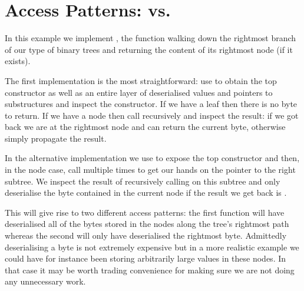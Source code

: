 \section{Access Patterns:  vs. }\label{appendix:rightmost}

In this example we implement , the function walking
down the rightmost branch of our type of binary trees and returning the
content of its rightmost node (if it exists).

The first implementation is the most straightforward: use 
to obtain the top constructor as well as an entire layer of deserialised values
and pointers to substructures and inspect the constructor.
%
If we have a leaf then there is no byte to return.
%
If we have a node then call  recursively and inspect the
result: if we got  back we are at the rightmost node and can
return the current byte, otherwise simply propagate the result.


In the alternative implementation we use  to expose the top
constructor and then, in the node case, call  multiple times
to get our hands on the pointer to the right subtree.
%
We inspect the result of recursively calling  on this
subtree and only deserialise the byte contained in the current node if the result
we get back is .


This will give rise to two different access patterns: the first function will
have deserialised all of the bytes stored in the nodes along the tree's
rightmost path whereas the second will only have deserialised the rightmost byte.
%
Admittedly deserialising a byte is not extremely expensive but in a more realistic
example we could have for instance been storing arbitrarily large values in
these nodes. In that case it may be worth trading convenience for making sure we
are not doing any unnecessary work.
